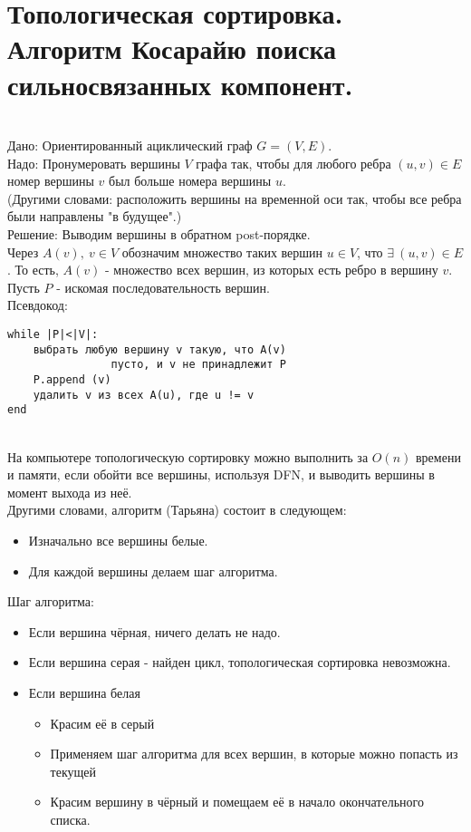 \section{Топологическая сортировка. Алгоритм Косарайю поиска сильносвязанных компонент.}
\\
Дано: Ориентированный ациклический граф $G = (V, E)$.\\
Надо: Пронумеровать вершины $V$ графа так, чтобы для любого ребра $(u, v) \in E$ номер вершины $v$ был больше номера вершины $u$.\\
(Другими словами: расположить вершины на временной оси так, чтобы все ребра были направлены "в будущее".)\\
Решение: Выводим вершины в обратном post-порядке.\\
Через $A(v),\ v\in V$ обозначим множество таких вершин $u\in V$, что $\exists\  (u,v)\in E$.
То есть, $A(v)$ - множество всех вершин, из которых есть ребро в вершину $v$. Пусть $P$ -
искомая последовательность вершин.\\
Псевдокод:
\begin{verbatim}
while |P|<|V|:
    выбрать любую вершину v такую, что A(v) 
                пусто, и v не принадлежит P
    P.append (v)
    удалить v из всех A(u), где u != v
end
\end{verbatim}
\\

На компьютере топологическую сортировку можно выполнить за $O(n)$ времени и памяти,
если обойти все вершины, используя DFN, и выводить вершины в момент выхода из неё.\\
Другими словами, алгоритм (Тарьяна) состоит в следующем:
\begin{itemize}
\item Изначально все вершины белые.
\item Для каждой вершины делаем шаг алгоритма.
\end{itemize}
Шаг алгоритма:
\begin{itemize}
\item Если вершина чёрная, ничего делать не надо.
\item Если вершина серая - найден цикл, топологическая сортировка невозможна.
\item Если вершина белая
\begin{itemize}
\item Красим её в серый
\item Применяем шаг алгоритма для всех вершин, в которые можно попасть из текущей
\item Красим вершину в чёрный и помещаем её в начало окончательного списка.
\end{itemize}
\end{itemize}

